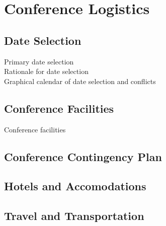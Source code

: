 \section{Conference Logistics}

\subsection{Date Selection}
Primary date selection\\
Rationale for date selection\\
Graphical calendar of date selection and conflicts\\
\subsection{Conference Facilities}
Conference facilities\\
\subsection{Conference Contingency Plan}
\subsection{Hotels and Accomodations}
\subsection{Travel and Transportation}